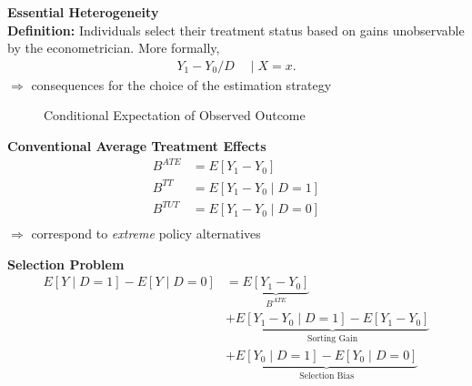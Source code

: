 \begin{frame}
\textbf{Essential Heterogeneity} \\ \vspace{15pt}
\textbf{Definition:} Individuals select their treatment status based on gains unobservable by the econometrician. More formally,
\begin{align*}
Y_1 - Y_0 / D\quad \mid X = x.
\end{align*}
\(\Rightarrow\) consequences for the choice of the estimation strategy
\end{frame}


\begin{frame}
\begin{figure}[htp]\centering
	\caption{Conditional Expectation of Observed Outcome}\label{eh-Conditional Expectation}
\end{figure}
\end{frame}


\begin{frame}
\textbf{Conventional Average Treatment Effects}
\begin{align*}
B^{ATE} & = E[Y_1 - Y_0 ]\\
B^{TT} & = E[Y_1 - Y_0 \mid D = 1]\\
B^{TUT} & = E[Y_1 - Y_0 \mid D = 0]\\
\end{align*}
\(\Rightarrow\) correspond to \emph{extreme} policy alternatives
\end{frame}


\begin{frame}
\textbf{Selection Problem}
\begin{align*}
E[Y\mid D = 1] - E[Y\mid D = 0] & = \underbrace{E[Y_1 - Y_0]}_{B^{ATE}} \\
	 							& + \underbrace{E[Y_1 - Y_0 \mid D = 1] - E[Y_1 - Y_0]}_{\text{Sorting Gain}} \\
								& + \underbrace{E[Y_0\mid D = 1] - E[Y_0 \mid D = 0]}_{\text{Selection Bias}}
\end{align*}
\end{frame}


